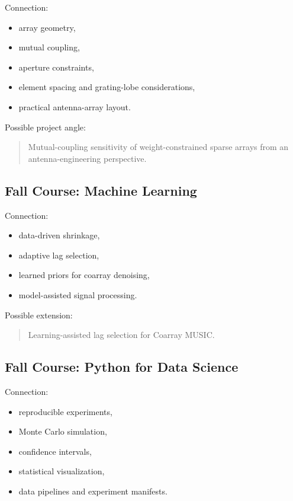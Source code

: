 \documentclass[11pt,letterpaper]{article}
\begin{document}
Connection:
\begin{itemize}[leftmargin=*]
    \item array geometry,
    \item mutual coupling,
    \item aperture constraints,
    \item element spacing and grating-lobe considerations,
    \item practical antenna-array layout.
\end{itemize}

Possible project angle:
\begin{quote}
Mutual-coupling sensitivity of weight-constrained sparse arrays from an antenna-engineering perspective.
\end{quote}

\subsection{Fall Course: Machine Learning}

Connection:
\begin{itemize}[leftmargin=*]
    \item data-driven shrinkage,
    \item adaptive lag selection,
    \item learned priors for coarray denoising,
    \item model-assisted signal processing.
\end{itemize}

Possible extension:
\begin{quote}
Learning-assisted lag selection for Coarray MUSIC.
\end{quote}

\subsection{Fall Course: Python for Data Science}

Connection:
\begin{itemize}[leftmargin=*]
    \item reproducible experiments,
    \item Monte Carlo simulation,
    \item confidence intervals,
    \item statistical visualization,
    \item data pipelines and experiment manifests.
\end{itemize}
\end{document}
